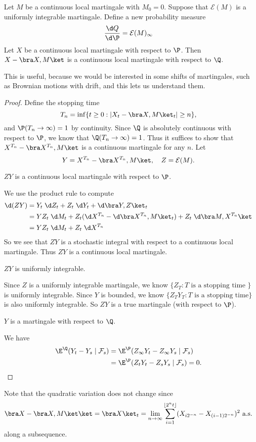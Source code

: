 \documentclass[a4paper]{article}
\begin{document}
\begin{thm}
  Let $M$ be a continuous local martingale with $M_0 = 0$. Suppose that $\mathcal{E}(M)$ is a uniformly integrable martingale. Define a new probability measure
  \[
    \frac{\d Q}{\d \P} = \mathcal{E}(M)_\infty
  \]
  Let $X$ be a continuous local martingale with respect to $\P$. Then $X - \bra X, M\ket$ is a continuous local martingale with respect to $\Q$.
\end{thm}
This is useful, because we would be interested in some shifts of martingales, such as Brownian motions with drift, and this lets us understand them.

\begin{proof}
  Define the stopping time
  \[
    T_n = \inf\{ t \geq 0: |X_t - \bra X, M\ket_t| \geq n\},
  \]
  and $\P(T_n \to \infty) = 1$ by continuity. Since $\Q$ is absolutely continuous with respect to $\P$, we know that $\Q(T_n \to \infty) = 1$. Thus it suffices to show that $X^{T_n} - \bra X^{T_n}, M\ket$ is a continuous martingale for any $n$. Let
  \[
    Y = X^{T_n} - \bra X^{T_n}, M\ket,\quad Z = \mathcal{E}(M).
  \]
  \begin{claim}
    $ZY$ is a continuous local martingale with respect to $\P$.
  \end{claim}
  We use the product rule to compute
  \begin{align*}
    \d (ZY) &= Y_t \;\d Z_t + Z_t \;\d Y_t + \d \bra Y, Z\ket_t\\
    &= Y Z_t \;\d M_t + Z_t (\d X^{T_n} - \d \bra X^{T_n}, M\ket_t) + Z_t \;\d \bra M, X^{T_n}\ket\\
    &= Y Z_t \;\d M_t + Z_t\;\d X^{T_n}
  \end{align*}
  So we see that $ZY$ is a stochastic integral with respect to a continuous local martingale. Thus $ZY$ is a continuous local martingale.

  \begin{claim}
    $ZY$ is uniformly integrable.
  \end{claim}
  Since $Z$ is a uniformly integrable martingale, we know $\{Z_T: T\text{ is a stopping time }\}$ is uniformly integrable. Since $Y$ is bounded, we know $\{Z_T Y_T: T\text{ is a stopping time}\}$ is also uniformly integrable. So $ZY$ is a true martingale (with respect to $\P$).

  \begin{claim}
    $Y$ is a martingale with respect to $\Q$.
  \end{claim}
  We have
  \begin{align*}
    \E^{\Q}(Y_t - Y_s \mid \mathcal{F}_s) &= \E^\P(Z_\infty Y_t - Z_\infty Y_s \mid \mathcal{F}_s)\\
    &= \E^{\P} (Z_t Y_t - Z_s Y_s \mid \mathcal{F}_s) = 0.\qedhere
  \end{align*}
\end{proof}
Note that the quadratic variation does not change since
\[
  \bra X - \bra X, M\ket \ket = \bra X \ket_t = \lim_{n \to \infty} \sum_{i = 1}^{\lfloor 2^n t \rfloor} (X_{i 2^{-n}} - X_{(i - 1)2^{-n}})^2\text{ a.s.}
\]
along a subsequence.


\printindex
\end{document}
